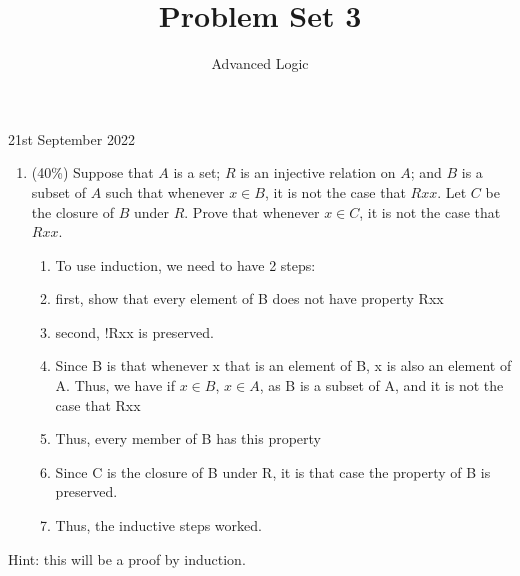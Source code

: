 \documentclass[10pt]{article}
\title{Problem Set 3 }
\author{Advanced Logic}
\date{}
\begin{document}
\maketitle

21st September 2022

\begin{enumerate}
  \item (40\%) Suppose that $A$ is a set; $R$ is an injective relation on $A$; and $B$ is a subset of $A$ such that whenever $x \in B$, it is not the case that $R x x$. Let $C$ be the closure of $B$ under $R$. Prove that whenever $x \in C$, it is not the case that $R x x$.
  \begin{enumerate}
    \item To use induction, we need to have 2 steps:
    \item first, show that every element of B does not have property Rxx
    \item second, !Rxx is preserved.
    \item Since B is that whenever x that is an element of B, x is also an element of A. Thus, we have if $x \in B$, $x \in A$, as B is a subset of A, and it is not the case that Rxx
    \item Thus, every member of B has this property
    \item Since C is the closure of B under R, it is that case the property of B is preserved. 
    \item Thus, the inductive steps worked. 
\end{enumerate}
\end{enumerate}
Hint: this will be a proof by induction.
\end{document}

